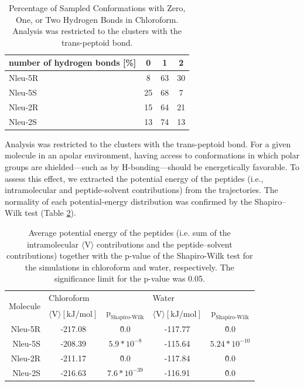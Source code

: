 \begin{table}[h!]
    \centering
    \caption{Percentage of Sampled Conformations with Zero, One, or Two Hydrogen Bonds in Chloroform. Analysis was restricted to the clusters with the trans-peptoid bond.}
    \label{tab: hbondsratio}
    \begin{adjustbox}{max width=\textwidth}
    \begin{tabular}{lccc}
    number of hydrogen bonds [\%] &	0 &	1 &	2 \\
    \hline
    Nleu-5R  &	8	& 63	& 30 \\
    Nleu-5S  &	25	& 68	& 7  \\
    Nleu-2R  &	15	& 64	& 21 \\
    Nleu-2S  &	13	& 74	& 13 \\
    \hline
    \end{tabular}
    \end{adjustbox}
\end{table}

Analysis was restricted to the clusters with the trans-peptoid bond.
For a given molecule in an apolar environment, having access to conformations in which polar groups are shielded—such as by H-bonding—should be energetically favorable. 
To assess this effect, we extracted the potential energy of the peptides (i.e., intramolecular and peptide-solvent contributions) from the trajectories. 
The normality of each potential-energy distribution was confirmed by the Shapiro–Wilk test \cite{Shapiro1965} (Table \ref{tab: SIstatTestingNorm}). 

\begin{table}[h!]
\centering
\caption{ Average potential energy of the peptides  (i.e. sum of the intramolecular $\langle \text{V} \rangle$ contributions  and  the  peptide–solvent  contributions)  together  with  the  p-value  of  the Shapiro-Wilk test for the simulations in chloroform and water, respectively. The significance limit for the p-value was 0.05.}
\label{tab: SIstatTestingNorm}
\begin{adjustbox}{max width=\textwidth}
\begin{tabular}{r|cc|cc}
\multirow{2}{*}{Molecule} & \multicolumn{2}{l}{Chloroform} & \multicolumn{2}{l}{Water}        \\
    & $\langle \text{V} \rangle [\text{kJ}/\text{mol}]$ & $\text{p}_{\text{Shapiro-Wilk}}$ & $\langle \text{V} \rangle [\text{kJ}/\text{mol}]$ & $\text{p}_{\text{Shapiro-Wilk}}$  \\
    \hline
    Nleu-5R    & -217.08    & \~0.0          & -117.77  & \~0.0         \\
    Nleu-5S    & -208.39    &   $5.9*10^{-8}$  & -115.64  & $5.24*10^{-10}$ \\
    Nleu-2R    & -211.17    & \~0.0          & -117.84  & \~0.0         \\
    Nleu-2S    & -216.63    &   $7.6*10^{-39}$ & -116.91  & \~0.0   \\
    \hline
\end{tabular}%
\end{adjustbox}
\end{table}

